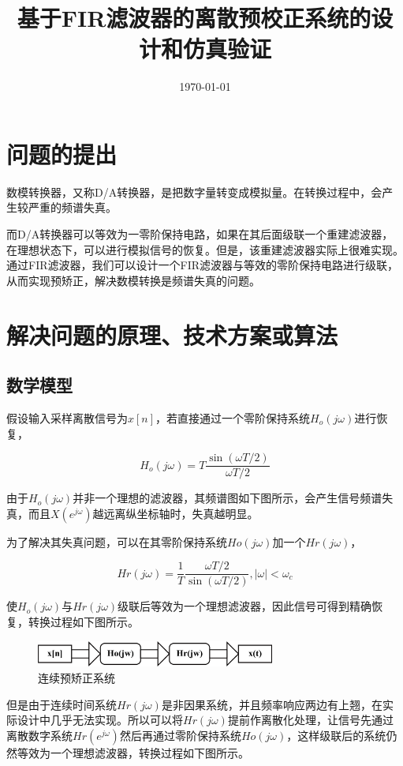 \documentclass{../source/Experiment}
\title{基于FIR滤波器的离散预校正系统的设计和仿真验证}
\date{\today}
\begin{document}
    \makecover
    


    \section{问题的提出}
	数模转换器，又称D/A转换器，是把数字量转变成模拟量。在转换过程中，会产生较严重的频谱失真。
	
	而D/A转换器可以等效为一零阶保持电路，如果在其后面级联一个重建滤波器，在理想状态下，可以进行模拟信号的恢复。但是，该重建滤波器实际上很难实现。通过FIR滤波器，我们可以设计一个FIR滤波器与等效的零阶保持电路进行级联，从而实现预矫正，解决数模转换是频谱失真的问题。
	    
    \section{解决问题的原理、技术方案或算法}
        \subsection{数学模型}

            假设输入采样离散信号为$x[n]$，若直接通过一个零阶保持系统$H_o(j\omega)$进行恢复，
                
            $$H_o(j \omega)=T \frac{\sin (\omega T / 2)}{\omega T / 2}$$
            
            由于$H_o(j\omega)$并非一个理想的滤波器，其频谱图如下图所示，会产生信号频谱失真，而且$X(e^{j\omega})$越远离纵坐标轴时，失真越明显。
            
            为了解决其失真问题，可以在其零阶保持系统$Ho(j\omega)$加一个$Hr(j\omega)$，
            
            $$H r(j \omega)=\frac{1}{T} \frac{\omega T / 2}{\sin (\omega T / 2)},|\omega|<\omega_{c}$$
            
            使$H_o(j\omega)$与$Hr(j\omega)$级联后等效为一个理想滤波器，因此信号可得到精确恢复，转换过程如下图所示。

            \begin{figure}[H]
                \centering
                \includegraphics[width = 0.7\textwidth]{pic/sys1.png}
                \caption{连续预矫正系统}
            \end{figure}
            
            但是由于连续时间系统$Hr(j\omega)$是非因果系统，并且频率响应两边有上翘，在实际设计中几乎无法实现。所以可以将$Hr(j\omega)$提前作离散化处理，让信号先通过离散数字系统$Hr(e^{j\omega})$然后再通过零阶保持系统$Ho(j\omega)$，这样级联后的系统仍然等效为一个理想滤波器，转换过程如下图所示。
\end{document}
